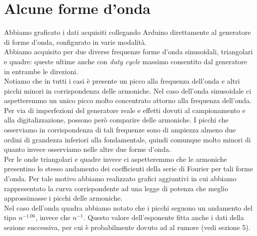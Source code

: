 \documentclass{article}[a4paper, oneside,11pt]
\begin{document}
\section{Alcune forme d'onda}
Abbiamo graficato i dati acquisiti collegando Arduino direttamente al generatore di forme d'onda, configurato in varie modalità.\\
Abbiamo acquisito per due diverse frequenze forme d'onda sinusoidali, triangolari e quadre: queste ultime anche con \textit{duty cycle} massimo consentito dal generatore in entrambe le direzioni. \\
Notiamo che in tutti i casi è presente un picco alla frequenza dell'onda e altri picchi minori in corrispondenza delle armoniche. Nel caso dell'onda sinusoidale ci aspetteremmo un unico picco molto concentrato attorno alla frequenza dell'onda. Per via di imperfezioni del generatore reale e effetti dovuti al campionamento e alla digitalizzazione, possono però comparire delle armoniche. I picchi che osserviamo in corrispondenza di tali frequenze sono di ampiezza almeno due ordini di grandezza inferiori alla fondamentale, quindi comunque molto minori di quanto invece osserviamo nelle altre due forme d'onda.\\
Per le onde triangolari e quadre invece ci aspetteremmo che le armoniche presentino lo stesso andamento dei coefficienti della serie di Fourier per tali forme d'onda. Per tale motivo abbiamo realizzato grafici aggiuntivi in cui abbiamo rappresentato la curva corrispondente ad una legge di potenza che meglio approssimasse i picchi delle armoniche.\\
Nel caso dell'onda quadra abbiamo notato che i picchi seguono un andamento del tipo $n^{-1.06}$, invece che $n^{-1}$. Questo valore dell'esponente fitta anche i dati della sezione successiva, per cui è probabilmente dovuto ad al rumore (vedi sezione 5).
\end{document}
